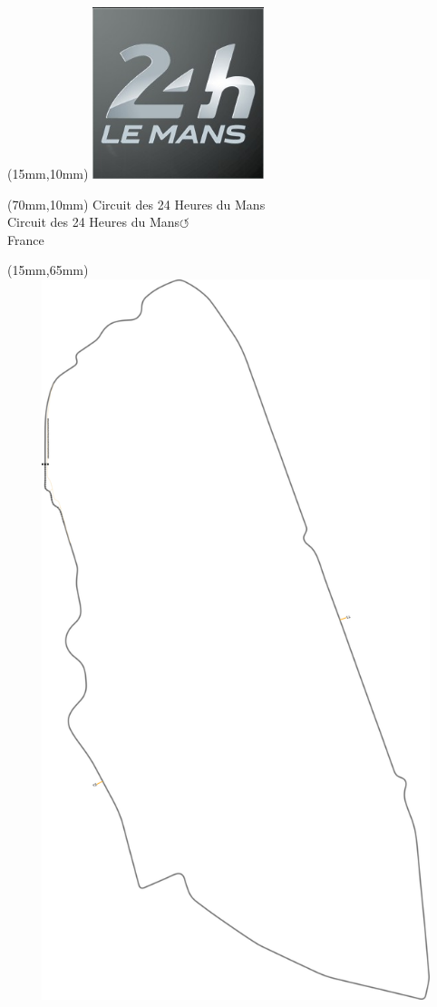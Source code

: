\null\newpage
\begin{textblock*}{50mm}(15mm,10mm)%
\includegraphics[width=50mm]{LG/2015-05-20_00084.png}
\end{textblock*}
\begin{textblock*}{130mm}(70mm,10mm)%
{\fontsize{20}{20}\selectfont Circuit des 24 Heures du Mans\\}
{\fontsize{16}{16}\selectfont Circuit des 24 Heures du Mans\hfill \Large$\circlearrowleft$\\}
{\fontsize{12}{12}\selectfont France\\}
\end{textblock*}
\begin{textblock*}{185mm}(15mm,65mm)%
\centering
\mbox{\includegraphics[width=185mm,height=210mm,keepaspectratio]{PT/CIDUMA.pdf}}
\end{textblock*}
